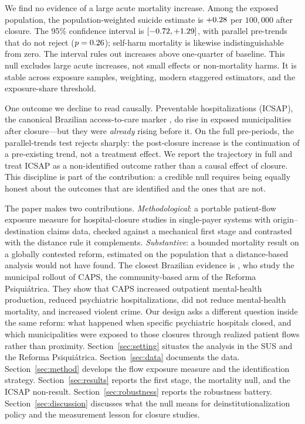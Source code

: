 We find no evidence of a large acute mortality increase. Among the
exposed population, the population-weighted suicide estimate is
$+0.28$ per $100{,}000$ after closure. The 95\% confidence
interval is $[-0.72, +1.29]$, with parallel pre-trends that
do not reject ($p = 0.26$); self-harm mortality is likewise
indistinguishable from zero. The interval rules out increases above
one-quarter of baseline. This null excludes large acute increases, not
small effects or non-mortality harms. It is stable across exposure
samples, weighting, modern staggered estimators, and the exposure-share
threshold.

One outcome we decline to read causally. Preventable hospitalizations
(ICSAP), the canonical Brazilian access-to-care marker
\citep{macinkoHarris2015, rochaSoares2010}, do rise in exposed
municipalities after closure---but they were \emph{already} rising
before it. On the full pre-periods, the parallel-trends test rejects
sharply: the post-closure increase is the continuation of a
pre-existing trend, not a treatment effect. We report the trajectory in
full and treat ICSAP as a non-identified outcome rather than a causal
effect of closure. This discipline is part of the
contribution: a credible null requires being equally honest about the
outcomes that are identified and the ones that are not.

The paper makes two contributions. \emph{Methodological}: a portable
patient-flow exposure measure for hospital-closure studies in
single-payer systems with origin--destination claims data, checked
against a mechanical first stage and contrasted with the distance rule
it complements. \emph{Substantive}: a bounded mortality result on
a globally contested reform, estimated on the population that a
distance-based analysis would not have found.
The closest Brazilian evidence is \citet{diasFontes2024}, who study the
municipal rollout of CAPS, the community-based arm of the Reforma
Psiquiátrica. They show that CAPS increased outpatient mental-health
production, reduced psychiatric hospitalizations, did not reduce
mental-health mortality, and increased violent crime. Our design asks a
different question inside the same reform: what happened when specific
psychiatric hospitals closed, and which municipalities were exposed to
those closures through realized patient flows rather than proximity.
Section~\ref{sec:setting} situates the analysis in the SUS and the
Reforma Psiquiátrica. Section~\ref{sec:data} documents the data.
Section~\ref{sec:method} develops the flow exposure measure and the
identification strategy. Section~\ref{sec:results} reports the first
stage, the mortality null, and the ICSAP non-result.
Section~\ref{sec:robustness} reports the robustness battery.
Section~\ref{sec:discussion} discusses what the null means for
deinstitutionalization policy and the measurement lesson for closure
studies.
